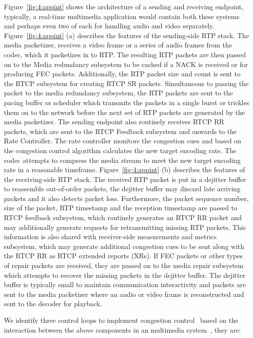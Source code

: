 Figure~\ref{fig:4:appint} shows the architecture of a sending and receiving
endpoint, typically, a real-time multimedia application would contain both
these systems and perhaps even two of each for handling audio and video
separately. Figure~\ref{fig:4:appint} (a) describes the features of the
sending-side RTP stack. The media packetizer, receives a video frame or a
series of audio frames from the codec, which it packetizes in to RTP.  The
resulting RTP packets are then passed on to the Media redundancy subsystem to
be cached if a NACK is received or for producing FEC packets. Additionally,
the RTP packet size and count is sent to the RTCP subsystem for creating RTCP
SR packets. Simultaneous to passing the packet to the media redundancy
subsystem, the RTP packets are sent to the pacing buffer or scheduler which
transmits the packets in a single burst or trickles them on to the network
before the next set of RTP packets are generated by the media packetizer. The
sending endpoint also routinely receives RTCP RR packets, which are sent to
the RTCP Feedback  subsystem and onwards to the Rate Controller. The rate
controller monitors the congestion cues and based on the congestion control
algorithm calculates the  new target encoding rate. The codec attempts to
compress the media stream to meet the new target encoding rate in a reasonable
timeframe. Figure~\ref{fig:4:appint} (b) describes the features of the
receiving-side RTP stack. The received RTP packet is put in a dejitter buffer
to reassemble out-of-order packets, the dejitter buffer may discard late arriving
packets and it also detects packet loss. Furthermore, the packet sequence
number,  size of the packet, RTP timestamp and the reception timestamp are
passed to RTCP feedback subsystem, which routinely generates an RTCP RR packet
and may additionally generate requests for retransmitting missing RTP packets.
This information is also shared with receiver-side measurements and metrics
subsystem, which may generate additional congestion cues to be sent along with
the RTCP RR as RTCP extended reports (XRs). If FEC packets or other types of
repair packets are received, they are passed on to the media repair subsystem
which attempts to recover the missing packets in the dejitter buffer. The
dejitter buffer is typically small to maintain communication interactivity and
packets are sent to the media packetizer where an audio or video frame is
reconstructed and sent to the decoder for playback.


We identify three control loops to implement congestion
control~\cite{Singh:control.loops.api} based on the interaction between the
above components in an multimedia system~\cite{draft.rmcat.app.interaction},
they are:

